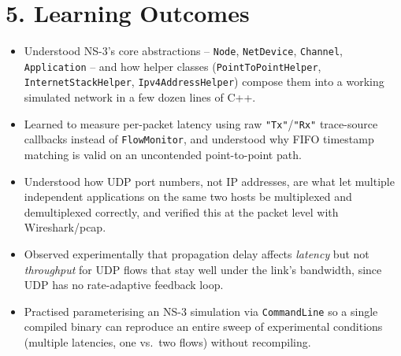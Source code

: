 \documentclass[11pt]{article}
\begin{document}
\section*{5. Learning Outcomes}
\begin{itemize}
  \item Understood NS-3's core abstractions -- \texttt{Node}, \texttt{NetDevice},
        \texttt{Channel}, \texttt{Application} -- and how helper classes
        (\texttt{PointToPointHelper}, \texttt{InternetStackHelper},
        \texttt{Ipv4AddressHelper}) compose them into a working simulated
        network in a few dozen lines of C++.
  \item Learned to measure per-packet latency using raw \texttt{"Tx"}/\texttt{"Rx"}
        trace-source callbacks instead of \texttt{FlowMonitor}, and understood
        why FIFO timestamp matching is valid on an uncontended
        point-to-point path.
  \item Understood how UDP port numbers, not IP addresses, are what let
        multiple independent applications on the same two hosts be
        multiplexed and demultiplexed correctly, and verified this at the
        packet level with Wireshark/pcap.
  \item Observed experimentally that propagation delay affects \emph{latency}
        but not \emph{throughput} for UDP flows that stay well under the
        link's bandwidth, since UDP has no rate-adaptive feedback loop.
  \item Practised parameterising an NS-3 simulation via \texttt{CommandLine}
        so a single compiled binary can reproduce an entire sweep of
        experimental conditions (multiple latencies, one vs.\ two flows)
        without recompiling.
\end{itemize}
\end{document}
